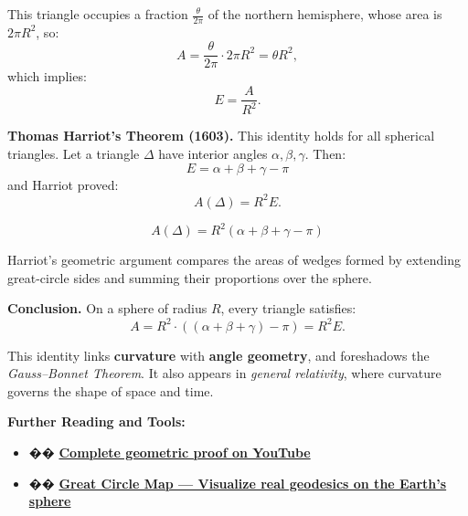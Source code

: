 \documentclass[11pt]{article}
\newcommand{\highlight}[1]{\textcolor{myred}{\textbf{#1}}}
\begin{document}
This triangle occupies a fraction \( \frac{\theta}{2\pi} \) of the northern hemisphere, whose area is \( 2\pi R^2 \), so:
\[
A = \frac{\theta}{2\pi} \cdot 2\pi R^2 = \theta R^2,
\]
which implies:
\[
E = \frac{A}{R^2}.
\]

\bigskip

\highlight{Thomas Harriot’s Theorem (1603).}  
This identity holds for all spherical triangles. Let a triangle \( \Delta \) have interior angles \( \alpha, \beta, \gamma \). Then:
\[
E = \alpha + \beta + \gamma - \pi
\]
and Harriot proved:
\[
A(\Delta) = R^2 E.
\]

\begin{tcolorbox}[colback=white, colframe=myred, title=\textbf{Harriot’s Formula}, title filled=true]
\[
\boxed{A(\Delta) = R^2(\alpha + \beta + \gamma - \pi)}
\]
\end{tcolorbox}

Harriot’s geometric argument compares the areas of wedges formed by extending great-circle sides and summing their proportions over the sphere.

\bigskip

\highlight{Conclusion.}  
On a sphere of radius \( R \), every triangle satisfies:
\[
A = R^2 \cdot \left( (\alpha + \beta + \gamma) - \pi \right) = R^2 E.
\]

This identity links \highlight{curvature} with \highlight{angle geometry}, and foreshadows the \emph{Gauss–Bonnet Theorem}. It also appears in \emph{general relativity}, where curvature governs the shape of space and time.

\bigskip

\highlight{Further Reading and Tools:}
\begin{itemize}
    \item �� \href{https://www.youtube.com/watch?v=Y8VgvoEx7HY}{\textbf{Complete geometric proof on YouTube}}
    \item �� \href{https://www.greatcirclemap.com/}{\textbf{Great Circle Map — Visualize real geodesics on the Earth’s sphere}}
\end{itemize}
\end{document}
